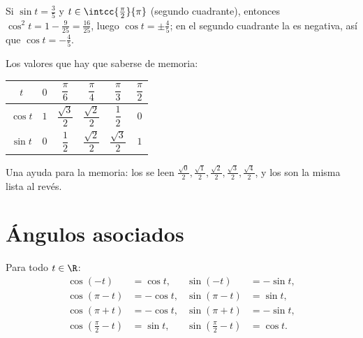 \begin{example}\label{ex:g11:trigo:identity}
Si $\sin t = \frac35$ y $t \in \intcc{\frac\pi2}{\pi}$ (segundo
cuadrante), entonces $\cos^2 t = 1 - \frac{9}{25} = \frac{16}{25}$, luego
$\cos t = \pm\frac45$; en el segundo cuadrante la  es negativa, así
que $\cos t = -\frac45$.
\end{example}

Los valores que hay que saberse de memoria:
\begin{center}
\begin{tabular}{c|ccccc}
$t$ & $0$ & $\dfrac{\pi}{6}$ & $\dfrac{\pi}{4}$ & $\dfrac{\pi}{3}$ & $\dfrac{\pi}{2}$\\[6pt]
\hline\rule{0pt}{14pt}%
$\cos t$ & $1$ & $\dfrac{\sqrt3}{2}$ & $\dfrac{\sqrt2}{2}$ & $\dfrac12$ & $0$\\[6pt]
$\sin t$ & $0$ & $\dfrac12$ & $\dfrac{\sqrt2}{2}$ & $\dfrac{\sqrt3}{2}$ & $1$
\end{tabular}
\end{center}

\begin{remark}
Una ayuda para la memoria: los  se leen
$\frac{\sqrt0}{2}, \frac{\sqrt1}{2}, \frac{\sqrt2}{2}, \frac{\sqrt3}{2},
\frac{\sqrt4}{2}$, y los  son la misma lista al revés.
\end{remark}

\section{Ángulos asociados}

\begin{proposition}\label{prop:g11:trigo:associated}
Para todo $t \in \R$:
\[
\begin{aligned}
\cos(-t) &= \cos t, & \sin(-t) &= -\sin t,\\
\cos(\pi - t) &= -\cos t, & \sin(\pi - t) &= \sin t,\\
\cos(\pi + t) &= -\cos t, & \sin(\pi + t) &= -\sin t,\\
\cos\left(\tfrac{\pi}{2} - t\right) &= \sin t, &
\sin\left(\tfrac{\pi}{2} - t\right) &= \cos t .
\end{aligned}
\]
\end{proposition}

